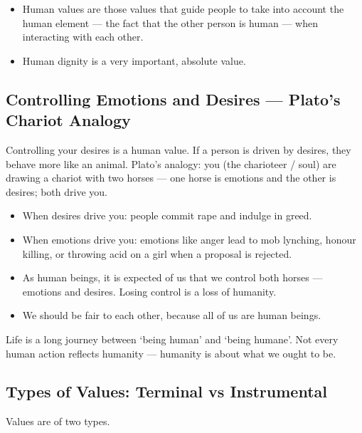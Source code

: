 \begin{KeyConcept}
\begin{itemize}
\item Human values are those values that guide people to take into account the human element --- the fact that the other person is human --- when interacting with each other.
\item Human dignity is a very important, absolute value.
\end{itemize}
\end{KeyConcept}

\subsection{Controlling Emotions and Desires --- Plato's Chariot Analogy}

Controlling your desires is a human value. If a person is driven by desires, they behave more like an animal. Plato's analogy: you (the charioteer / soul) are drawing a chariot with two horses --- one horse is emotions and the other is desires; both drive you.

\begin{itemize}
\item When desires drive you: people commit rape and indulge in greed.
\item When emotions drive you: emotions like anger lead to mob lynching, honour killing, or throwing acid on a girl when a proposal is rejected.
\item As human beings, it is expected of us that we control both horses --- emotions and desires. Losing control is a loss of humanity.
\item We should be fair to each other, because all of us are human beings.
\end{itemize}

\begin{CriticalPoint}
Life is a long journey between `being human' and `being humane'. Not every human action reflects humanity --- humanity is about what we ought to be.
\end{CriticalPoint}

\subsection{Types of Values: Terminal vs Instrumental}

Values are of two types.

